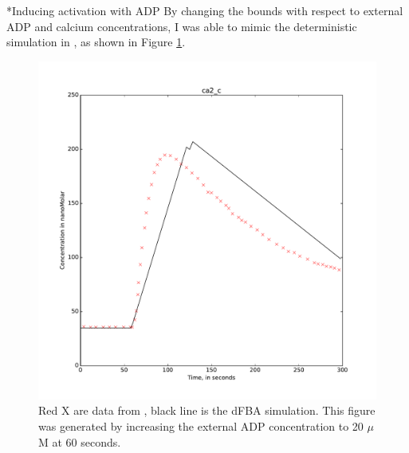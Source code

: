\documentclass[11pt]{article}
\makeatletter
\renewcommand\subsection{\@startsection
	{subsection}{2}{0mm}
	{-0.05in}
	{-0.5\baselineskip}
	{\normalfont\normalsize\bfseries}}
\makeatother
\begin{document}
\subsection*{Inducing activation with ADP}
By changing the bounds with respect to external ADP and calcium concentrations, I was able to mimic the deterministic simulation in \cite{purvis2008molecular}, as shown in Figure \ref{fig:ADPspike}. 
\begin{figure}
\centering
\includegraphics[scale=.35]{../figures/internalCa}
\caption{Red X are data from \cite{purvis2008molecular}, black line is the dFBA simulation. This figure was generated by increasing the external ADP concentration to 20 $\mu$M at 60 seconds.}
\label{fig:ADPspike}
\end{figure}
\end{document}
